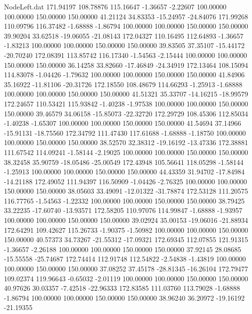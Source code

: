 \begin{filecontents}{NodeLeft.dat}
 171.94197  108.78876  115.16647    -1.36657   -2.22607  100.00000  100.00000  150.00000  150.00000   41.21124   34.83353  -15.24957  -24.84076
 171.99268  110.09796  116.37482    -1.68888   -1.86794  100.00000  100.00000  150.00000  150.00000   39.90204   33.62518  -19.06055  -21.08143
 172.04327  110.16495  112.64893    -1.36657   -1.83213  100.00000  100.00000  150.00000  150.00000   39.83505   37.35107  -15.44172  -20.70240
 172.08391  113.85742  116.17340    -1.54563   -2.15444  100.00000  100.00000  150.00000  150.00000   36.14258   33.82660  -17.46849  -24.34919
 172.13464  108.15094  114.83078    -1.04426   -1.79632  100.00000  100.00000  150.00000  150.00000   41.84906   35.16922  -11.81106  -20.31726
 172.18550  108.48679  114.66293    -1.25913   -1.68888  100.00000  100.00000  150.00000  150.00000   41.51321   35.33707  -14.16215  -18.99579
 172.24657  110.53421  115.93842    -1.40238   -1.97538  100.00000  100.00000  150.00000  150.00000   39.46579   34.06158  -15.85073  -22.32720
 172.29729  108.45306  112.85034    -1.40238   -1.65307  100.00000  100.00000  150.00000  150.00000   41.54694   37.14966  -15.91131  -18.75560
 172.34792  111.47430  117.61688    -1.68888   -1.18750  100.00000  100.00000  150.00000  150.00000   38.52570   32.38312  -19.16192  -13.47336
 172.38881  111.67542  114.09241    -1.58144   -2.19025  100.00000  100.00000  150.00000  150.00000   38.32458   35.90759  -18.05486  -25.00549
 172.43948  105.56641  118.05298    -1.58144   -1.25913  100.00000  100.00000  150.00000  150.00000   44.43359   31.94702  -17.84984  -14.21188
 172.49052  111.94397  116.50909    -1.04426   -2.76325  100.00000  100.00000  150.00000  150.00000   38.05603   33.49091  -12.01322  -31.78874
 172.53128  111.20575  116.77765    -1.54563   -1.22332  100.00000  100.00000  150.00000  150.00000   38.79425   33.22235  -17.60740  -13.93571
 172.58205  110.97076  114.99847    -1.68888   -1.93957  100.00000  100.00000  150.00000  150.00000   39.02924   35.00153  -19.06016  -21.88934
 172.64291  109.42627  115.26733    -1.90375   -1.50982  100.00000  100.00000  150.00000  150.00000   40.57373   34.73267  -21.55312  -17.09321
 172.69345  112.07855  121.91315    -1.36657   -2.26188  100.00000  100.00000  150.00000  150.00000   37.92145   28.08685  -15.55558  -25.74687
 172.74414  112.91748  112.54822    -2.54838   -1.43819  100.00000  100.00000  150.00000  150.00000   37.08252   37.45178  -28.81345  -16.26104
 172.79477  109.02374  119.96643    -0.65032   -2.01119  100.00000  100.00000  150.00000  150.00000   40.97626   30.03357   -7.42518  -22.96333
 172.83585  111.03760  113.79028    -1.68888   -1.86794  100.00000  100.00000  150.00000  150.00000   38.96240   36.20972  -19.16192  -21.19355

\end{filecontents}
